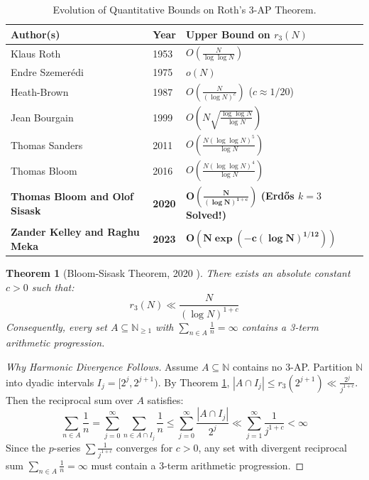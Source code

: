 \documentclass[11pt,a4paper]{article}
\newtheorem{theorem}{Theorem}[section]
\theoremstyle{definition}
\begin{document}
\begin{table}[h!]
\centering
\begin{tabular}{lll}
\toprule
\textbf{Author(s)} & \textbf{Year} & \textbf{Upper Bound on } $r_3(N)$ \\
\midrule
Klaus Roth \cite{roth1953} & 1953 & $O\left(\frac{N}{\log \log N}\right)$ \\
Endre Szemer\'edi \cite{szemeredi1975} & 1975 & $o(N)$ \\
Heath-Brown \cite{heathbrown1987} & 1987 & $O\left(\frac{N}{(\log N)^c}\right)$ ($c \approx 1/20$) \\
Jean Bourgain \cite{bourgain1999} & 1999 & $O\left(N \sqrt{\frac{\log \log N}{\log N}}\right)$ \\
Thomas Sanders \cite{sanders2011} & 2011 & $O\left(\frac{N (\log \log N)^5}{\log N}\right)$ \\
Thomas Bloom \cite{bloom2016} & 2016 & $O\left(\frac{N (\log \log N)^4}{\log N}\right)$ \\
\textbf{Thomas Bloom and Olof Sisask} \cite{bloom2020} & \textbf{2020} & $\mathbf{O\left(\frac{N}{(\log N)^{1 + c}}\right)}$ \textbf{(Erd\H{o}s $k=3$ Solved!)} \\
\textbf{Zander Kelley and Raghu Meka} \cite{kelley2023} & \textbf{2023} & $\mathbf{O\left(N \exp\left( - c (\log N)^{1/12} \right)\right)}$ \\
\bottomrule
\end{tabular}
\caption{Evolution of Quantitative Bounds on Roth's 3-AP Theorem.}
\label{tab:roth_bounds}
\end{table}

\begin{theorem}[Bloom-Sisask Theorem, 2020 \cite{bloom2020}]\label{thm:bloom_sisask}
There exists an absolute constant $c > 0$ such that:
\begin{equation}\label{eq:bs_bound}
r_3(N) \ll \frac{N}{(\log N)^{1 + c}}
\end{equation}
Consequently, every set $A \subseteq \mathbb{N}_{\ge 1}$ with $\sum_{n \in A} \frac{1}{n} = \infty$ contains a 3-term arithmetic progression.
\end{theorem}

\begin{proof}[Why Harmonic Divergence Follows]
Assume $A \subseteq \mathbb{N}$ contains no 3-AP.
Partition $\mathbb{N}$ into dyadic intervals $I_j = [2^j, 2^{j+1})$.
By Theorem \ref{thm:bloom_sisask}, $|A \cap I_j| \le r_3(2^{j+1}) \ll \frac{2^j}{j^{1+c}}$.
Then the reciprocal sum over $A$ satisfies:
\[ \sum_{n \in A} \frac{1}{n} = \sum_{j=0}^\infty \sum_{n \in A \cap I_j} \frac{1}{n} \le \sum_{j=0}^\infty \frac{|A \cap I_j|}{2^j} \ll \sum_{j=1}^\infty \frac{1}{j^{1+c}} < \infty \]
Since the $p$-series $\sum \frac{1}{j^{1+c}}$ converges for $c > 0$, any set with divergent reciprocal sum $\sum_{n \in A} \frac{1}{n} = \infty$ must contain a 3-term arithmetic progression.
\end{proof}
\end{document}
